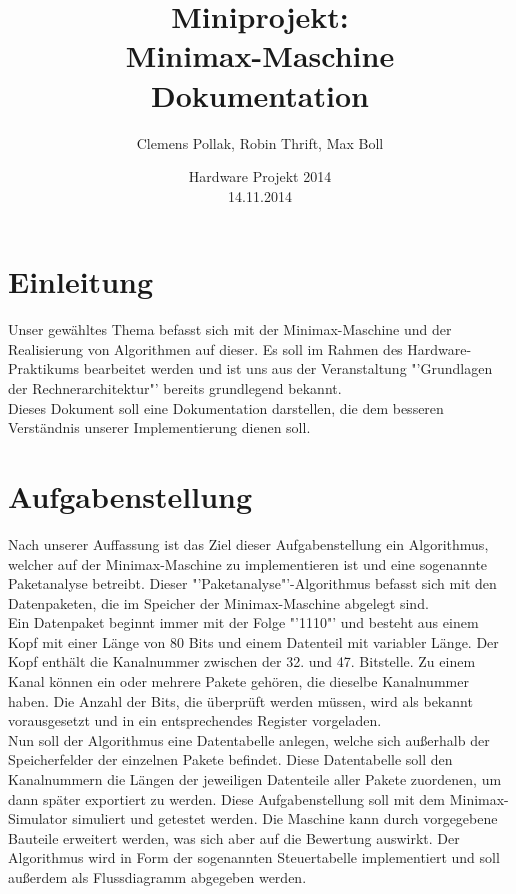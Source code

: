 \documentclass[12pt,titlepage]{article}
\begin{document}
\title{Miniprojekt: \\ Minimax-Maschine \\ Dokumentation}
\author{Clemens Pollak, Robin Thrift, Max Boll}
\date{Hardware Projekt 2014 \\ 14.11.2014}
\maketitle

\tableofcontents

\newpage

\section{Einleitung} 
Unser gew{\"a}hltes Thema befasst sich mit der Minimax-Maschine und der Realisierung von Algorithmen auf dieser. Es soll im Rahmen des Hardware-Praktikums bearbeitet werden und ist uns aus der Veranstaltung "'Grundlagen der Rechnerarchitektur"' bereits grundlegend bekannt.\\ Dieses Dokument soll eine Dokumentation darstellen, die dem besseren Verst{\"a}ndnis unserer Implementierung dienen soll.


\section{Aufgabenstellung}
Nach unserer Auffassung ist das Ziel dieser Aufgabenstellung ein Algorithmus, welcher auf der Minimax-Maschine zu implementieren ist und eine sogenannte Paketanalyse betreibt. Dieser "'Paketanalyse"'-Algorithmus befasst sich mit den Datenpaketen, die im Speicher der Minimax-Maschine abgelegt sind.\\ Ein Datenpaket beginnt immer mit der Folge "'1110"' und besteht aus einem
Kopf mit einer L{\"a}nge von 80 Bits und einem Datenteil mit variabler L{\"a}nge. Der Kopf enth{\"a}lt die Kanalnummer zwischen der 32. und 47. Bitstelle. Zu einem Kanal k{\"o}nnen ein oder mehrere Pakete geh{\"o}ren, die dieselbe Kanalnummer haben.
Die Anzahl der Bits, die überprüft werden müssen, wird als bekannt vorausgesetzt und in ein entsprechendes Register vorgeladen.\\
Nun soll der Algorithmus eine Datentabelle anlegen, welche sich au{\ss}erhalb der Speicherfelder der einzelnen Pakete befindet. Diese Datentabelle soll den Kanalnummern die L{\"a}ngen der jeweiligen Datenteile aller Pakete zuordenen, um dann später exportiert zu werden. Diese Aufgabenstellung soll mit dem Minimax-Simulator simuliert und getestet werden. Die Maschine kann durch vorgegebene Bauteile erweitert werden, was sich aber auf die Bewertung auswirkt. Der Algorithmus wird in Form der sogenannten Steuertabelle implementiert und soll außerdem als Flussdiagramm abgegeben werden.
\end{document}
